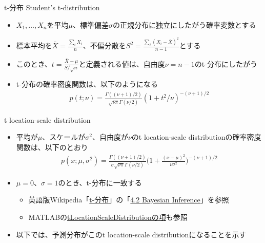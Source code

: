 \documentclass[aspectratio=169,unicode,dvipdfmx,14pt]{beamer}
\begin{document}
\begin{frame}{t-分布 Student's t-distribution}
\begin{itemize}
\item $X_1,\ldots,X_n$を平均$\mu$、標準偏差$\sigma$の正規分布に独立にしたがう確率変数とする
\item 標本平均を$\bar{X}=\frac{\sum_i X_i}{n}$、不偏分散を$S^2=\frac{\sum_i (X_i - \bar{X})^2}{n-1}$とする
\item このとき、$t = \frac{\bar{X} - \mu}{S / \sqrt{n}}$と定義される値は、自由度$\nu=n-1$のt-分布にしたがう
\item t-分布の確率密度関数は、以下のようになる
\begin{align}
p(t;\nu) = \frac{\Gamma((\nu+1)/2)}{\sqrt{\nu\pi}\Gamma(\nu/2)}(1 + t^2/\nu)^{-(\nu+1)/2}
\end{align}
\end{itemize}
\end{frame}

\begin{frame}{t location-scale distribution}
\begin{itemize}
\item 平均が$\mu$、スケールが$\sigma^2$、自由度が$\nu$のt location-scale distributionの確率密度関数は、以下のとおり
\begin{align}
p(x;\mu,\sigma^2) =\frac{\Gamma((\nu+1)/2)}{\sigma\sqrt{\nu\pi}\Gamma(\nu/2)} \bigg( 1 + \frac{(x - \mu)^2}{\nu\sigma^2} \bigg)^{ - (\nu+1) / 2 }
\end{align}
\item $\mu=0$、$\sigma=1$のとき、t-分布に一致する
\begin{itemize}
\item 英語版Wikipedia「\href{https://en.wikipedia.org/wiki/Student's_t-distribution}{t-分布}」の「\href{https://en.wikipedia.org/wiki/Student's_t-distribution\#Bayesian_inference}{4.2 Bayesian Inference}」を参照
\item MATLABの\href{https://www.mathworks.com/help/stats/prob.tlocationscaledistribution.html}{tLocationScaleDistributionの項}も参照
\end{itemize}
\item 以下では、予測分布がこのt location-scale distributionになることを示す
\end{itemize}
\end{frame}
\end{document}
